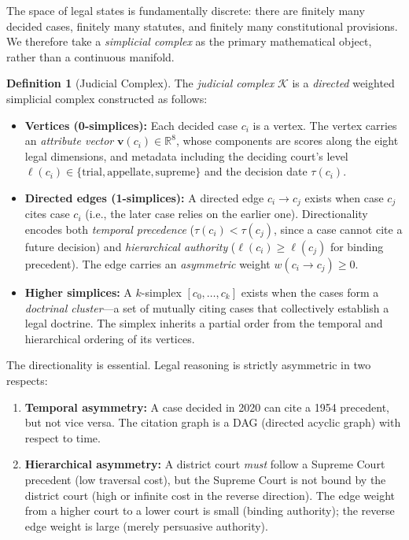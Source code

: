 \documentclass[12pt]{article}
\theoremstyle{definition}
\newtheorem{definition}[theorem]{Definition}
\theoremstyle{remark}
\newcommand{\R}{\mathbb{R}}
\begin{document}
The space of legal states is fundamentally discrete: there are finitely many decided cases, finitely many statutes, and finitely many constitutional provisions.  We therefore take a \emph{simplicial complex} as the primary mathematical object, rather than a continuous manifold.

\begin{definition}[Judicial Complex]
\label{def:judicial_complex}
The \emph{judicial complex} $\mathcal{K}$ is a \emph{directed} weighted simplicial complex constructed as follows:
\begin{itemize}
    \item \textbf{Vertices (0-simplices):} Each decided case $c_i$ is a vertex.  The vertex carries an \emph{attribute vector} $\mathbf{v}(c_i) \in \R^8$, whose components are scores along the eight legal dimensions, and metadata including the deciding court's level $\ell(c_i) \in \{\text{trial}, \text{appellate}, \text{supreme}\}$ and the decision date $\tau(c_i)$.
    \item \textbf{Directed edges (1-simplices):} A directed edge $c_i \to c_j$ exists when case $c_j$ cites case $c_i$ (i.e., the later case relies on the earlier one).  Directionality encodes both \emph{temporal precedence} ($\tau(c_i) < \tau(c_j)$, since a case cannot cite a future decision) and \emph{hierarchical authority} ($\ell(c_i) \geq \ell(c_j)$ for binding precedent).  The edge carries an \emph{asymmetric} weight $w(c_i \to c_j) \geq 0$.
    \item \textbf{Higher simplices:} A $k$-simplex $[c_0, \ldots, c_k]$ exists when the cases form a \emph{doctrinal cluster}---a set of mutually citing cases that collectively establish a legal doctrine.  The simplex inherits a partial order from the temporal and hierarchical ordering of its vertices.
\end{itemize}
\end{definition}

The directionality is essential.  Legal reasoning is strictly asymmetric in two respects:

\begin{enumerate}
    \item \textbf{Temporal asymmetry:}  A case decided in 2020 can cite a 1954 precedent, but not vice versa.  The citation graph is a DAG (directed acyclic graph) with respect to time.
    \item \textbf{Hierarchical asymmetry:}  A district court \emph{must} follow a Supreme Court precedent (low traversal cost), but the Supreme Court is not bound by the district court (high or infinite cost in the reverse direction).  The edge weight from a higher court to a lower court is small (binding authority); the reverse edge weight is large (merely persuasive authority).
\end{enumerate}
\end{document}
